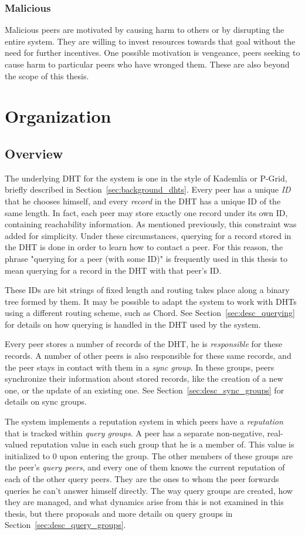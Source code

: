 \subsubsection{Malicious}
Malicious peers are motivated by causing harm to others or by disrupting the
entire system. They are willing to invest resources towards that goal without
the need for further incentives. One possible motivation is vengeance, peers
seeking to cause harm to particular peers who have wronged them. These are also
beyond the scope of this thesis.

\section{Organization}
\subsection{Overview}
The underlying \ac{DHT} for the system is one in the style of Kademlia or
P-Grid, briefly described in Section~\ref{sec:background_dhts}. Every peer has a
unique \emph{ID} that he chooses himself, and every \emph{record} in the
\ac{DHT} has a unique ID of the same length. In fact, each peer may store
exactly one record under its own ID, containing reachability information. As
mentioned previously, this constraint was added for simplicity. Under these
circumstances, querying for a record stored in the \ac{DHT} is done in order to
learn how to contact a peer. For this reason, the phrase "querying for a peer
(with some ID)" is frequently used in this thesis to mean querying for a record
in the \ac{DHT} with that peer's ID.

These IDs are bit strings of fixed length and routing takes place along a binary
tree formed by them. It may be possible to adapt the system to work with
\acp{DHT} using a different routing scheme, such as Chord. See
Section~\ref{sec:desc_querying} for details on how querying is handled in the
\ac{DHT} used by the system.

Every peer stores a number of records of the \ac{DHT}, he is \emph{responsible}
for these records. A number of other peers is also responsible for these same
records, and the peer stays in contact with them in a \emph{sync group}. In
these groups, peers synchronize their information about stored records, like the
creation of a new one, or the update of an existing one. See
Section~\ref{sec:desc_sync_groups} for details on sync groups.

The system implements a reputation system in which peers have a
\emph{reputation} that is tracked within \emph{query groups}. A peer has a
separate non-negative, real-valued reputation value in each such group that he
is a member of. This value is initialized to 0 upon entering the group. The
other members of these groups are the peer's \emph{query peers}, and every one
of them knows the current reputation of each of the other query peers. They are
the ones to whom the peer forwards queries he can't answer himself directly. The
way query groups are created, how they are managed, and what dynamics arise from
this is not examined in this thesis, but there proposals and more details on
query groups in Section~\ref{sec:desc_query_groups}.

